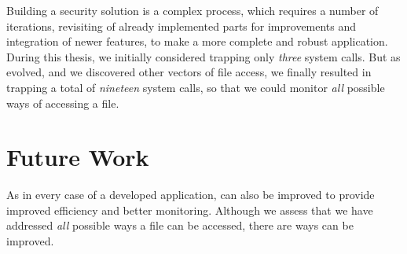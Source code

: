\par Building a security solution is a complex process, which requires a number of iterations, revisiting of already implemented parts for improvements and integration of newer features, to make a more complete and robust application. During this thesis, we initially considered trapping only \emph{three} system calls. But as  evolved, and we discovered other vectors of file access, we finally resulted in trapping a total of \emph{nineteen} system calls, so that we could monitor \emph{all} possible ways of accessing a file.


\section{Future Work}

\par As in every case of a developed application,  can also be improved to provide improved efficiency and better monitoring. Although we assess that we have addressed \emph{all} possible ways a file can be accessed, there are ways  can be improved.

